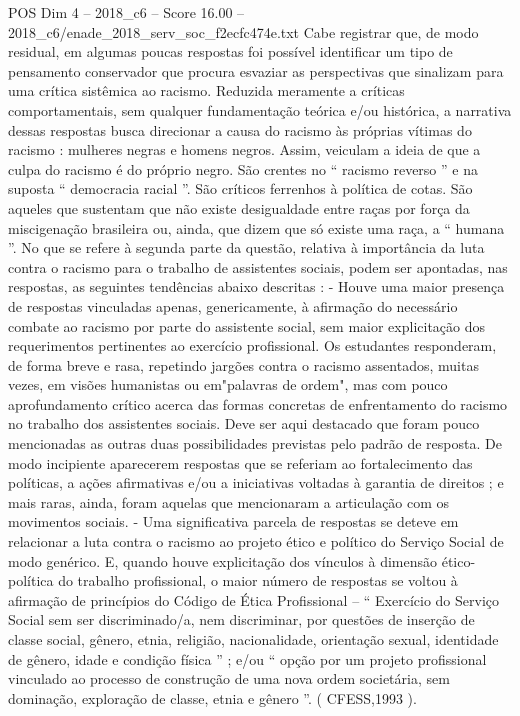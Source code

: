 \begin{textsample}{POS Dim 4 – 2018\_c6 – Score 16.00 – 2018\_c6/enade\_2018\_serv\_soc\_f2ecfc474e.txt}
Cabe registrar que, de modo residual, em algumas poucas respostas foi possível identificar um tipo de pensamento conservador que procura esvaziar as perspectivas que sinalizam para uma crítica sistêmica ao racismo.
Reduzida meramente a críticas comportamentais, sem qualquer fundamentação teórica e/ou histórica, a narrativa dessas respostas busca direcionar a causa do racismo às próprias vítimas do racismo : mulheres negras e homens negros.
Assim, veiculam a ideia de que a culpa do racismo é do próprio negro.
São crentes no “ racismo reverso ” e na suposta “ democracia racial ”.
São críticos ferrenhos à política de cotas.
São aqueles que sustentam que não existe desigualdade entre raças por força da miscigenação brasileira ou, ainda, que dizem que só existe uma raça, a “ humana ”.
No que se refere à segunda parte da questão, relativa à importância da luta contra o racismo para o trabalho de assistentes sociais, podem ser apontadas, nas respostas, as seguintes tendências abaixo descritas : - Houve uma maior presença de respostas vinculadas apenas, genericamente, à afirmação do necessário combate ao racismo por parte do assistente social, sem maior explicitação dos requerimentos pertinentes ao exercício profissional.
Os estudantes responderam, de forma breve e rasa, repetindo jargões contra o racismo assentados, muitas vezes, em visões humanistas ou em"palavras de ordem", mas com pouco aprofundamento crítico acerca das formas concretas de enfrentamento do racismo no trabalho dos assistentes sociais.
Deve ser aqui destacado que foram pouco mencionadas as outras duas possibilidades previstas pelo padrão de resposta.
De modo incipiente aparecerem respostas que se referiam ao fortalecimento das políticas, a ações afirmativas e/ou a iniciativas voltadas à garantia de direitos ; e mais raras, ainda, foram aquelas que mencionaram a articulação com os movimentos sociais. - Uma significativa parcela de respostas se deteve em relacionar a luta contra o racismo ao projeto ético e político do Serviço Social de modo genérico.
E, quando houve explicitação dos vínculos à dimensão ético-política do trabalho profissional, o maior número de respostas se voltou à afirmação de princípios do Código de Ética Profissional – “ Exercício do Serviço Social sem ser discriminado/a, nem discriminar, por questões de inserção de classe social, gênero, etnia, religião, nacionalidade, orientação sexual, identidade de gênero, idade e condição física ” ; e/ou “ opção por um projeto profissional vinculado ao processo de construção de uma nova ordem societária, sem dominação, exploração de classe, etnia e gênero ”. ( CFESS,1993 ).

\end{textsample}
